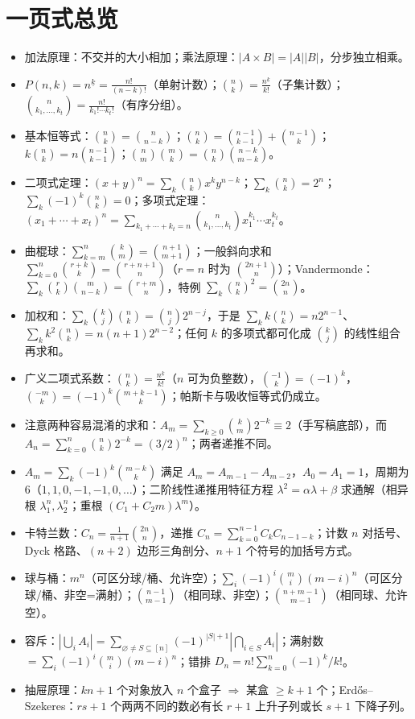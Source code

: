 \documentclass[UTF8,a4paper,11pt]{ctexart}
\begin{document}
\section*{一页式总览}
\begin{itemize}
\item 加法原理：不交并的大小相加；乘法原理：$|A\times B|=|A||B|$，分步独立相乘。
\item $P(n,k)=n^{\underline{k}}=\frac{n!}{(n-k)!}$（单射计数）；$\binom nk=\frac{n^{\underline{k}}}{k!}$（子集计数）；$\binom{n}{k_1,\dots,k_t}=\frac{n!}{k_1!\cdots k_t!}$（有序分组）。
\item 基本恒等式：$\binom nk=\binom n{n-k}$；$\binom nk=\binom{n-1}{k-1}+\binom{n-1}k$；$k\binom nk=n\binom{n-1}{k-1}$；$\binom nm\binom mk=\binom nk\binom{n-k}{m-k}$。
\item 二项式定理：$(x+y)^n=\sum_k\binom nk x^ky^{n-k}$；$\sum_k\binom nk=2^n$；$\sum_k(-1)^k\binom nk=0$；多项式定理：$(x_1+\cdots+x_t)^n=\sum_{k_1+\cdots+k_t=n}\binom{n}{k_1,\dots,k_t}x_1^{k_1}\cdots x_t^{k_t}$。
\item 曲棍球：$\sum_{k=m}^n\binom km=\binom{n+1}{m+1}$；一般斜向求和 $\sum_{k=0}^n\binom{r+k}{k}=\binom{r+n+1}{n}$（$r=n$ 时为 $\binom{2n+1}{n}$）；Vandermonde：$\sum_k\binom rk\binom m{n-k}=\binom{r+m}{n}$，特例 $\sum_k\binom nk^2=\binom{2n}{n}$。
\item 加权和：$\sum_k\binom kj\binom nk=\binom nj2^{n-j}$，于是 $\sum_k k\binom nk=n2^{n-1}$、$\sum_k k^2\binom nk=n(n+1)2^{n-2}$；任何 $k$ 的多项式都可化成 $\binom kj$ 的线性组合再求和。
\item 广义二项式系数：$\binom nk=\frac{n^{\underline k}}{k!}$（$n$ 可为负整数），$\binom{-1}{k}=(-1)^k$，$\binom{-m}{k}=(-1)^k\binom{m+k-1}{k}$；帕斯卡与吸收恒等式仍成立。\item 注意两种容易混淆的求和：$A_m=\sum_{k\ge0}\binom{k}{m}2^{-k}\equiv2$（手写稿底部），而 $A_n=\sum_{k=0}^n\binom{n}{k}2^{-k}=(3/2)^n$；两者递推不同。
\item $A_m=\sum_k(-1)^k\binom{m-k}{k}$ 满足 $A_m=A_{m-1}-A_{m-2}$，$A_0=A_1=1$，周期为 $6$（$1,1,0,-1,-1,0,\dots$）；二阶线性递推用特征方程 $\lambda^2=\alpha\lambda+\beta$ 求通解（相异根 $\lambda_1^n,\lambda_2^n$；重根 $(C_1+C_2m)\lambda^m$）。
\item 卡特兰数：$C_n=\frac1{n+1}\binom{2n}{n}$，递推 $C_n=\sum_{k=0}^{n-1}C_kC_{n-1-k}$；计数 $n$ 对括号、Dyck 格路、$(n+2)$ 边形三角剖分、$n+1$ 个符号的加括号方式。
\item 球与桶：$m^n$（可区分球/桶、允许空）；$\sum_i(-1)^i\binom mi(m-i)^n$（可区分球/桶、非空=满射）；$\binom{n-1}{m-1}$（相同球、非空）；$\binom{n+m-1}{m-1}$（相同球、允许空）。
\item 容斥：$|\bigcup_iA_i|=\sum_{\varnothing\ne S\subseteq[n]}(-1)^{|S|+1}|\bigcap_{i\in S}A_i|$；满射数 $=\sum_i(-1)^i\binom mi(m-i)^n$；错排 $D_n=n!\sum_{k=0}^n(-1)^k/k!$。
\item 抽屉原理：$kn+1$ 个对象放入 $n$ 个盒子 $\Rightarrow$ 某盒 $\ge k+1$ 个；Erdős--Szekeres：$rs+1$ 个两两不同的数必有长 $r+1$ 上升子列或长 $s+1$ 下降子列。
\end{itemize}
\end{document}
